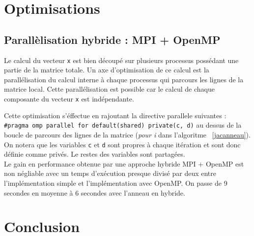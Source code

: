 \documentclass[a4paper]{article}
\begin{document}
\section{Optimisations}

\subsection{Parallèlisation hybride : MPI + OpenMP}
Le calcul du vecteur \texttt{x} est bien découpé sur plusieurs
processus possédant une partie de la matrice totale. Un axe
d'optimisation de ce calcul est la parallélisation du calcul interne à
chaque processus qui parcours les lignes de la matrice local. Cette
parallélisation est possible car le calcul de chaque composante du
vecteur \texttt{x} est indépendante.

Cette optimisation s'éffectue en rajoutant la directive parallele suivantes : \\
\verb|#pragma omp parallel for default(shared) private(c, d)| au dessus de la
boucle de parcours des lignes de la matrice (\emph{pour i} dans l'algoritme~
\ref{jacanneau}). On notera que les variables \texttt{c} et \texttt{d} sont
propres à chaque itération et sont donc définie comme privés. Le restes des
variables sont partagées.\\

Le gain en performance obtenue par une approche hybride MPI + OpenMP
est non négliable avec un temps d'exécution presque divisé par deux
entre l'implémentation simple et l'implémentation avec OpenMP. On
passe de 9 secondes en moyenne à 6 secondes avec l'anneau en hybride.

\section{Conclusion}
\end{document}
